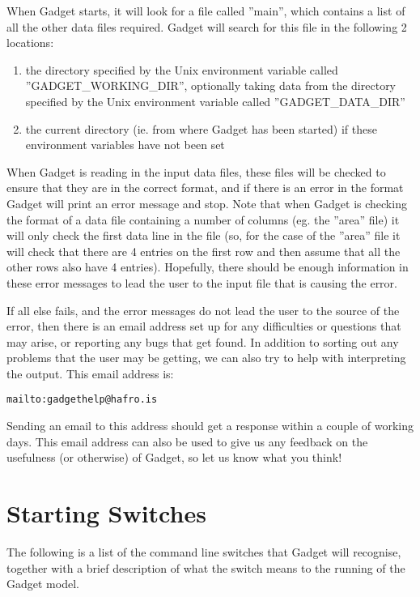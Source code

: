 \documentclass[10pt,twoside]{book}
\begin{document}
\bigskip
When Gadget starts, it will look for a file called ''main'', which contains a list of all the other data files required.  Gadget will search for this file in the following 2 locations:

\begin{enumerate}
\item the directory specified by the Unix environment variable called ''GADGET\_WORKING\_DIR'', optionally taking data from the directory specified by the Unix environment variable called ''GADGET\_DATA\_DIR''
\item the current directory (ie. from where Gadget has been started) if these environment variables have not been set
\end{enumerate}

When Gadget is reading in the input data files, these files will be checked to ensure that they are in the correct format, and if there is an error in the format Gadget will print an error message and stop.  Note that when Gadget is checking the format of a data file containing a number of columns (eg. the ''area'' file) it will only check the first data line in the file (so, for the case of the ''area'' file it will check that there are 4 entries on the first row and then assume that all the other rows also have 4 entries).  Hopefully, there should be enough information in these error messages to lead the user to the input file that is causing the error.

\bigskip
If all else fails, and the error messages do not lead the user to the source of the error, then there is an email address set up for any difficulties or questions that may arise, or reporting any bugs that get found.  In addition to sorting out any problems that the user may be getting, we can also try to help with interpreting the output.  This email address is:

{\small\begin{verbatim}
mailto:gadgethelp@hafro.is
\end{verbatim}}

Sending an email to this address should get a response within a couple of working days.  This email address can also be used to give us any feedback on the usefulness (or otherwise) of Gadget, so let us know what you think!

\section{Starting Switches}\label{sec:starting}
The following is a list of the command line switches that Gadget will recognise, together with a brief description of what the switch means to the running of the Gadget model.
\end{document}
